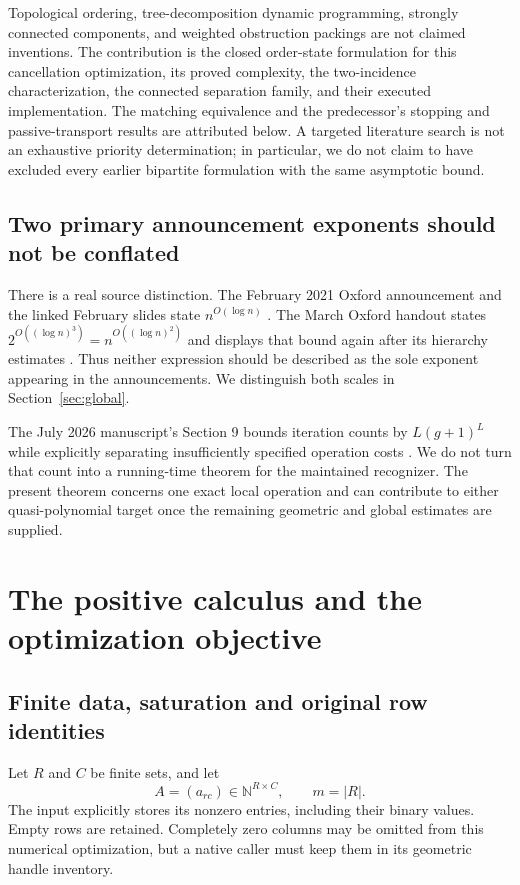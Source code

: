 \documentclass[11pt]{article}
\theoremstyle{definition}\newtheorem{definition}[theorem]{Definition}
\theoremstyle{remark}\newtheorem{remark}[theorem]{Remark}
\newcommand{\N}{\mathbb N}
\begin{document}
Topological ordering, tree-decomposition dynamic programming, strongly connected components, and weighted obstruction packings are not claimed inventions. The contribution is the closed order-state formulation for this cancellation optimization, its proved complexity, the two-incidence characterization, the connected separation family, and their executed implementation. The matching equivalence and the predecessor's stopping and passive-transport results are attributed below. A targeted literature search is not an exhaustive priority determination; in particular, we do not claim to have excluded every earlier bipartite formulation with the same asymptotic bound.

\subsection{Two primary announcement exponents should not be conflated}
There is a real source distinction. The February 2021 Oxford announcement and the linked February slides state $n^{O(\log n)}$ \cite{announcement,february}. The March Oxford handout states $2^{O((\log n)^3)}=n^{O((\log n)^2)}$ and displays that bound again after its hierarchy estimates \cite{march}. Thus neither expression should be described as the sole exponent appearing in the announcements. We distinguish both scales in Section~\ref{sec:global}.

The July 2026 manuscript's Section 9 bounds iteration counts by $L(g+1)^L$ while explicitly separating insufficiently specified operation costs \cite{lackenby}. We do not turn that count into a running-time theorem for the maintained recognizer. The present theorem concerns one exact local operation and can contribute to either quasi-polynomial target once the remaining geometric and global estimates are supplied.

\section{The positive calculus and the optimization objective}
\label{sec:calculus}

\subsection{Finite data, saturation and original row identities}
Let $R$ and $C$ be finite sets, and let
\[
 A=(a_{rc})\in\N^{R\times C},\qquad m=|R|.
\]
The input explicitly stores its nonzero entries, including their binary values. Empty rows are retained. Completely zero columns may be omitted from this numerical optimization, but a native caller must keep them in its geometric handle inventory.
\end{document}
